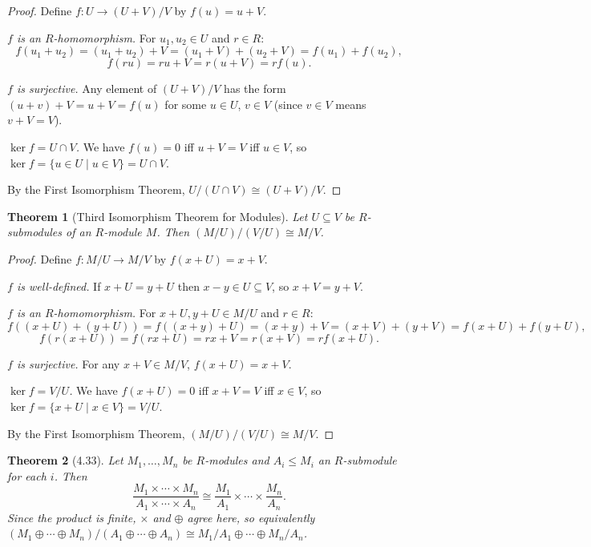 \documentclass[12pt]{article}
\newtheorem{theorem}{Theorem}
\begin{document}
\begin{proof}
Define $f : U \to (U+V)/V$ by $f(u) = u + V$.

\textit{$f$ is an $R$-homomorphism.} For $u_1, u_2 \in U$ and $r \in R$:
\[
  f(u_1 + u_2) = (u_1+u_2)+V = (u_1+V)+(u_2+V) = f(u_1)+f(u_2),
\]
\[
  f(ru) = ru+V = r(u+V) = rf(u).
\]

\textit{$f$ is surjective.} Any element of $(U+V)/V$ has the form $(u+v)+V = u+V = f(u)$ for some $u \in U$, $v \in V$ (since $v \in V$ means $v + V = V$).

\textit{$\ker f = U \cap V$.} We have $f(u) = 0$ iff $u+V = V$ iff $u \in V$, so $\ker f = \{u \in U \mid u \in V\} = U \cap V$.

By the First Isomorphism Theorem, $U/(U \cap V) \cong (U+V)/V$.
\end{proof}


\begin{theorem}[Third Isomorphism Theorem for Modules]
Let $U \subseteq V$ be $R$-submodules of an $R$-module $M$. Then $(M/U)/(V/U) \cong M/V$.
\end{theorem}

\begin{proof}
Define $f : M/U \to M/V$ by $f(x+U) = x+V$.

\textit{$f$ is well-defined.} If $x+U = y+U$ then $x-y \in U \subseteq V$, so $x+V = y+V$.

\textit{$f$ is an $R$-homomorphism.} For $x+U, y+U \in M/U$ and $r \in R$:
\[
  f((x+U)+(y+U)) = f((x+y)+U) = (x+y)+V = (x+V)+(y+V) = f(x+U)+f(y+U),
\]
\[
  f(r(x+U)) = f(rx+U) = rx+V = r(x+V) = rf(x+U).
\]

\textit{$f$ is surjective.} For any $x+V \in M/V$, $f(x+U) = x+V$.

\textit{$\ker f = V/U$.} We have $f(x+U) = 0$ iff $x+V = V$ iff $x \in V$, so $\ker f = \{x+U \mid x \in V\} = V/U$.

By the First Isomorphism Theorem, $(M/U)/(V/U) \cong M/V$.
\end{proof}

\begin{theorem}[4.33]
Let $M_1, \ldots, M_n$ be $R$-modules and $A_i \leq M_i$ an $R$-submodule for each $i$. Then
\[
  \frac{M_1 \times \cdots \times M_n}{A_1 \times \cdots \times A_n} \cong \frac{M_1}{A_1} \times \cdots \times \frac{M_n}{A_n}.
\]
Since the product is finite, $\times$ and $\oplus$ agree here, so equivalently $(M_1 \oplus \cdots \oplus M_n)/(A_1 \oplus \cdots \oplus A_n) \cong M_1/A_1 \oplus \cdots \oplus M_n/A_n$.
\end{theorem}
\end{document}
